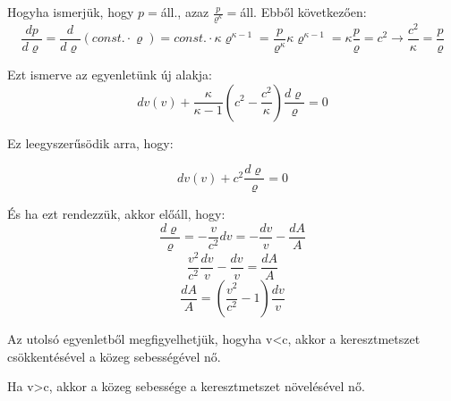 \documentclass[a4paper,titlepage,12pt]{article}
\begin{document}
Hogyha ismerjük, hogy $p=$áll., azaz $\frac{p}{\varrho^{\kappa}}=$áll. Ebből következően: $$\frac{dp}{d\varrho}=\frac{d}{d\varrho}(const.\cdot\varrho)=const.\cdot\kappa\varrho^{\kappa-1}=\frac{p}{\varrho^{\kappa}}\kappa\varrho^{\kappa-1}=\kappa\frac{p}{\varrho}=c^{2}\longrightarrow\frac{c^{2}}{\kappa}=\frac{p}{\varrho}$$

Ezt ismerve az egyenletünk új alakja: $$dv(v)+\frac{\kappa}{\kappa-1}(c^{2}-\frac{c^{2}}{\kappa})\frac{d\varrho}{\varrho}=0$$

Ez leegyszerűsödik arra, hogy:

$$dv(v)+c^{2}\frac{d\varrho}{\varrho}=0$$

És ha ezt rendezzük, akkor előáll, hogy: $$\frac{d\varrho}{\varrho}=
-\frac{v}{c^{2}}dv=-\frac{dv}{v}-\frac{dA}{A}$$ $$\frac{v^{2}}{c^{2}}\frac{dv}{v}-\frac{dv}{v}=\frac{dA}{A} $$ $$\frac{dA}{A}=(\frac{v^{2}}{c^{2}}-1)\frac{dv}{v} $$

Az utolsó egyenletből megfigyelhetjük, hogyha v<c, akkor a keresztmetszet csökkentésével a közeg sebességével nő.

Ha v>c, akkor a közeg sebessége a keresztmetszet növelésével nő.
\end{document}
